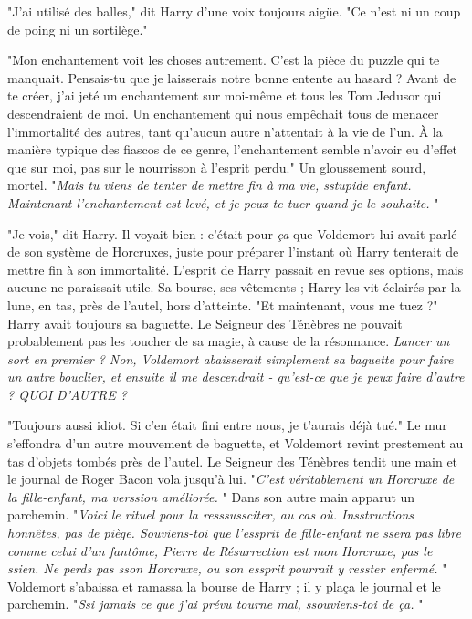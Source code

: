 "J'ai utilisé des balles," dit Harry d'une voix toujours aigüe. "Ce n'est ni un coup de poing ni un sortilège."

"Mon enchantement voit les choses autrement. C'est la pièce du puzzle qui te manquait. Pensais-tu que je laisserais notre bonne entente au hasard ? Avant de te créer, j'ai jeté un enchantement sur moi-même et tous les Tom Jedusor qui descendraient de moi. Un enchantement qui nous empêchait tous de menacer l'immortalité des autres, tant qu'aucun autre n'attentait à la vie de l'un. À la manière typique des fiascos de ce genre, l'enchantement semble n'avoir eu d'effet que sur moi, pas sur le nourrisson à l'esprit perdu." Un gloussement sourd, mortel. "\emph{Mais tu viens de tenter de mettre fin à ma vie, sstupide enfant. Maintenant l'enchantement est levé, et je peux te tuer quand je le souhaite.} "

"Je vois," dit Harry. Il voyait bien : c'était pour \emph{ça}  que Voldemort lui avait parlé de son système de Horcruxes, juste pour préparer l'instant où Harry tenterait de mettre fin à son immortalité. L'esprit de Harry passait en revue ses options, mais aucune ne paraissait utile. Sa bourse, ses vêtements ; Harry les vit éclairés par la lune, en tas, près de l'autel, hors d'atteinte. "Et maintenant, vous me tuez ?" Harry avait toujours sa baguette. Le Seigneur des Ténèbres ne pouvait probablement pas les toucher de sa magie, à cause de la résonnance. \emph{Lancer un sort en premier ? Non, Voldemort abaisserait simplement sa baguette pour faire un autre bouclier, et ensuite il me descendrait - qu'est-ce que je peux faire d'autre ? QUOI D'AUTRE ?} 

"Toujours aussi idiot. Si c'en était fini entre nous, je t'aurais déjà tué." Le mur s'effondra d'un autre mouvement de baguette, et Voldemort revint prestement au tas d'objets tombés près de l'autel. Le Seigneur des Ténèbres tendit une main et le journal de Roger Bacon vola jusqu'à lui. "\emph{C'est véritablement un Horcruxe de la fille-enfant, ma verssion améliorée.} " Dans son autre main apparut un parchemin. "\emph{Voici le rituel pour la resssussciter, au cas où. Insstructions honnêtes, pas de piège. Souviens-toi que l'essprit de fille-enfant ne ssera pas libre comme celui d'un fantôme, Pierre de Résurrection est mon Horcruxe, pas le ssien. Ne perds pas sson Horcruxe, ou son essprit pourrait y resster enfermé.} " Voldemort s'abaissa et ramassa la bourse de Harry ; il y plaça le journal et le parchemin. "\emph{Ssi jamais ce que j'ai prévu tourne mal, ssouviens-toi de ça.} "

